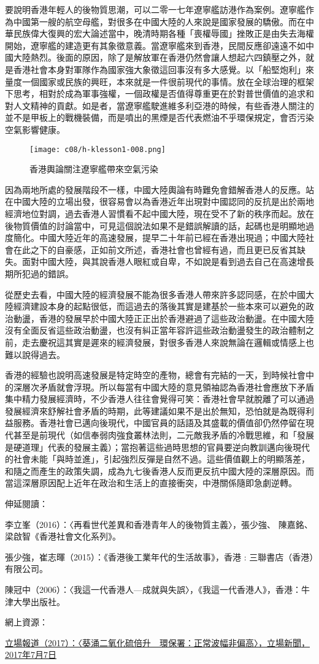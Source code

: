 要說明香港年輕人的後物質思潮，可以二零一七年遼寧艦訪港作為案例。遼寧艦作為中國第一艘的航空母艦，對很多在中國大陸的人來說是國家發展的驕傲。而在中華民族偉大復興的宏大論述當中，晚清時期各種「喪權辱國」挫敗正是由失去海權開始，遼寧艦的建造更有其象徵意義。當遼寧艦來到香港，民間反應卻遠遠不如中國大陸熱烈。後面的原因，除了是解放軍在香港仍然會讓人想起六四鎮壓之外，就是香港社會本身對軍隊作為國家強大象徵這回事沒有多大感覺。以「船堅炮利」來量度一個國家或民族的興旺，本來就是一件很前現代的事情。放在全球治理的框架下思考，相對於成為軍事強權，一個政權是否值得尊重更在於對普世價值的追求和對人文精神的貢獻。如是者，當遼寧艦駛進維多利亞港的時候，有些香港人關注的並不是甲板上的戰機裝備，而是噴出的黑煙是否代表燃油不乎環保規定，會否污染空氣影響健康。

\begin{figure}[htbp]
    \centering
    \texttt{[image: c08/h-klesson1-008.png]}
    \caption{香港輿論關注遼寧艦帶來空氣污染} 
\end{figure}

因為兩地所處的發展階段不一樣，中國大陸輿論有時難免會錯解香港人的反應。站在中國大陸的立場出發，很容易會以為香港近年出現對中國認同的反抗是出於兩地經濟地位對調，過去香港人習慣看不起中國大陸，現在受不了新的秩序而起。放在後物質價值的討論當中，可見這個說法如果不是錯誤解讀的話，起碼也是明顯地過度簡化。中國大陸近年的高速發展，提早二十年前已經在香港出現過；中國大陸社會在此之下的自豪感，正如前文所述，香港社會也曾經有過，而且更已反省其缺失。面對中國大陸，與其說香港人眼紅或自卑，不如說是看到過去自己在高速增長期所犯過的錯誤。

從歷史去看，中國大陸的經濟發展不能為很多香港人帶來許多認同感，在於中國大陸經濟建設本身的起點很低，而這過去的落後其實是建基於一些本來可以避免的政治動盪，香港的發展早於中國大陸正正出於香港避過了這些政治動盪。在中國大陸沒有全面反省這些政治動盪，也沒有糾正當年容許這些政治動盪發生的政治體制之前，走去慶祝這其實是遲來的經濟發展，對很多香港人來說無論在邏輯或情感上也難以說得過去。

香港的經驗也說明高速發展是特定時空的產物，總會有完結的一天，到時候社會中的深層次矛盾就會浮現。所以每當有中國大陸的意見領袖認為香港社會應放下矛盾集中精力發展經濟時，不少香港人往往會覺得可笑：香港社會早就脫離了可以通過發展經濟來舒解社會矛盾的時期，此等建議如果不是出於無知，恐怕就是為既得利益服務。香港社會已邁向後現代，中國官員的話語及其盛載的價值卻仍然停留在現代甚至是前現代（如信奉弱肉強食叢林法則，二元敵我矛盾的冷戰思維，和「發展是硬道理」代表的發展主義）；當抱著這些過時思想的官員要逆向教訓邁向後現代的社會未能「與時並進」，引起強烈反彈是自然不過。這些價值觀上的明顯落差，和隨之而產生的政策失調，成為九七後香港人反而更反抗中國大陸的深層原因。而當這深層原因配上近年在政治和生活上的直接衝突，中港關係隨即急劇逆轉。


伸延閱讀：

李立峯（2016）：〈再看世代差異和香港青年人的後物質主義〉，張少強、 陳嘉銘、梁啟智《香港社會文化系列》。

張少強，崔志暉（2015）：《香港後工業年代的生活故事》，香港 : 三聯書店（香港）有限公司。

陳冠中（2006）：〈我這一代香港人—成就與失誤〉，《我這一代香港人》，香港：牛津大學出版社。

網上資源：

\href{https://thestandnews.com/politics/遼寧號污染-葵涌二氧化硫倍升-環保署-正常波幅非偏高/}{立場報道（2017）：〈葵涌二氧化硫倍升　環保署：正常波幅非偏高〉，立場新聞，2017年7月7日}